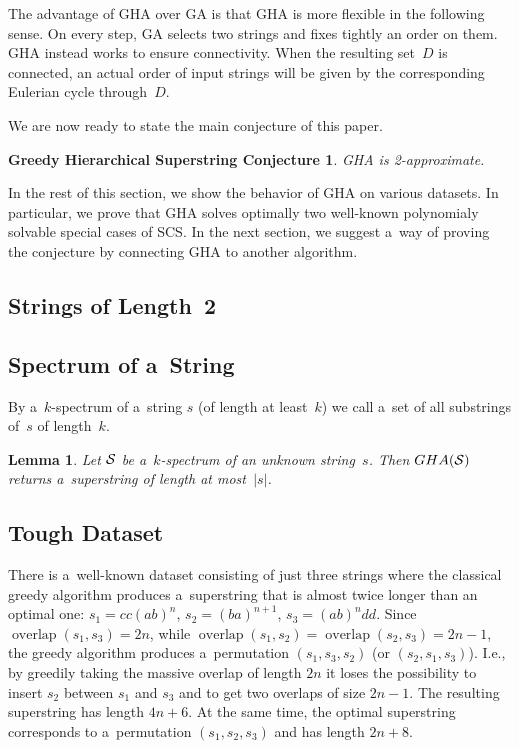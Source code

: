\documentclass[11pt,letterpaper]{article}
\newtheorem{lemma}{Lemma}
\DeclareMathOperator{\overlap}{overlap}
\begin{document}

The advantage of GHA over GA is that GHA is more flexible in the following sense. On every step, GA selects two strings and fixes tightly an order on them. GHA instead works to ensure connectivity. When the resulting set~$D$ is connected, an actual order of input strings will be given by the corresponding Eulerian cycle through~$D$.


We are now ready to state the main conjecture of this paper.
\newtheorem*{ghcc}{Greedy Hierarchical Superstring Conjecture}
\begin{ghcc}
GHA is 2-approximate.
\end{ghcc}
In the rest of this section, we show the behavior of GHA on various datasets. In particular, we prove that GHA solves optimally two well-known polynomialy solvable special cases of SCS. In the next section, we suggest a~way of proving the conjecture by connecting GHA to another algorithm.

\subsection{Strings of Length~2}

\subsection{Spectrum of a~String}
By a~$k$-spectrum of a~string $s$ 
(of length at least~$k$)
we call a~set of all substrings of~$s$ of length~$k$.

\begin{lemma}
Let ${\cal S}$ be a~$k$-spectrum of an unknown string~$s$. Then $GHA({\cal S})$ returns a~superstring of length at most~$|s|$. 
\end{lemma}

\subsection{Tough Dataset}
There is a~well-known dataset consisting of just three strings where the classical greedy algorithm produces a~superstring that is almost twice longer than an optimal one: $s_1=cc(ab)^n$, $s_2=(ba)^{n+1}$, $s_3=(ab)^ndd$. Since $\overlap(s_1, s_3)=2n$,
 while $\overlap(s_1,s_2)=\overlap(s_2,s_3)=2n-1$, the greedy algorithm produces a~permutation $(s_1, s_3, s_2)$ (or $(s_2,s_1,s_3)$). I.e., by greedily taking the massive overlap of length $2n$ it loses the possibility to insert $s_2$ between $s_1$ and $s_3$ and to get two overlaps of size $2n-1$. The resulting superstring has length $4n+6$. At the same time, the optimal superstring corresponds to a~permutation $(s_1,s_2,s_3)$ and has length $2n+8$.
 
\end{document}
